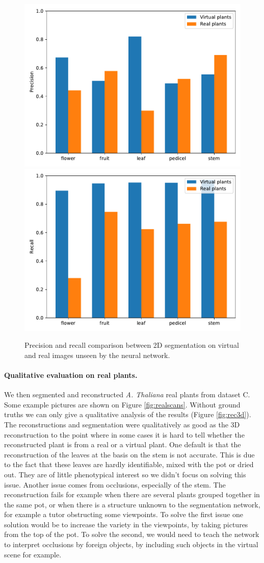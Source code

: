 \begin{figure}[h!]
    \centering \includegraphics[width =
0.5\linewidth]{figures/eval_precision_real.pdf}\includegraphics[width =
0.5\linewidth]{figures/eval_recall_real.pdf}
    \caption{Precision and recall comparison between 2D segmentation on
virtual and real images unseen by the neural network.} \label{fig:prec_recall_virt_real}
\end{figure}

\paragraph{Qualitative evaluation on real plants.}
We then segmented and reconstructed  \emph{A. Thaliana} real plants from dataset C. Some example pictures are shown on Figure \ref{fig:realscans}. Without ground truths we can only give a qualitative analysis of the results (Figure \ref{fig:rec3d}). The reconstructions and segmentation were qualitatively as good as the 3D reconstruction to the point where in some cases it is hard to tell whether the reconstructed plant is from a real or a virtual plant. One default is that the reconstruction of the leaves at the basis on the stem is not accurate. This is due to the fact that these leaves are hardly identifiable, mixed with the pot or dried out. They are of little phenotypical interest so we didn't focus on solving this issue. Another issue comes from occlusions, especially of the stem. The reconstruction fails for example when there are several plants grouped together in the same pot, or when there is a structure unknown to the segmentation network, for example a tutor obstructing some viewpoints. To solve the first issue one solution would be to increase the variety in the viewpoints, by taking pictures from the top of the pot. To solve the second, we would need to teach the network to interpret occlusions by foreign objects, by including such objects in the virtual scene for example.

